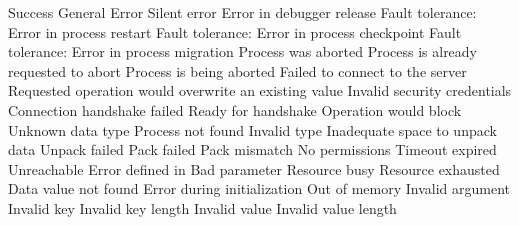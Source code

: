 \begin{constantdesc}
%
Success
%
General Error
%
Silent error
%
Error in debugger release
%
Fault tolerance: Error in process restart
%
Fault tolerance: Error in process checkpoint
%
Fault tolerance: Error in process migration
%
Process was aborted
%
Process is already requested to abort
%
Process is being aborted
%
Failed to connect to the server
%
Requested operation would overwrite an existing value
%
Invalid security credentials
%
Connection handshake failed
%
Ready for handshake
%
Operation would block
%
Unknown data type
%
Process not found
%
Invalid type
%
Inadequate space to unpack data
%
Unpack failed
%
Pack failed
%
Pack mismatch
%
No permissions
%
Timeout expired
%
Unreachable
%
Error defined in 
%
Bad parameter
%
Resource busy
%
Resource exhausted
%
Data value not found
%
Error during initialization
%
Out of memory
%
Invalid argument
%
Invalid key
%
Invalid key length
%
Invalid value
%
Invalid value length
%

\end{constantdesc}
